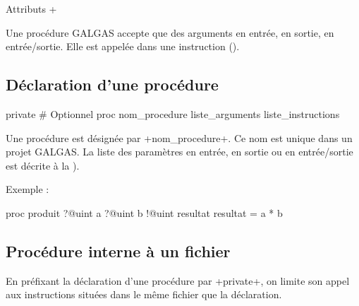 Attributs \ggs+%







Une procédure GALGAS accepte que des arguments en entrée, en sortie, en entrée/sortie. Elle est appelée dans une instruction ().

\subsection{Déclaration d'une procédure}

\begin{galgas}
private # Optionnel
proc nom_procedure liste_arguments {
  liste_instructions
}
\end{galgas}

Une procédure est désignée par \ggs+nom_procedure+. Ce nom est unique dans un projet GALGAS. La liste des paramètres en entrée, en sortie ou en entrée/sortie est décrite à la ).

Exemple :

\begin{galgas}
proc produit ?@uint a ?@uint b !@uint resultat {
  resultat = a * b
}
\end{galgas}



\subsection{Procédure interne à un fichier}

En préfixant la déclaration d'une procédure par \ggs+private+, on limite son appel aux instructions situées dans le même fichier que la déclaration.



